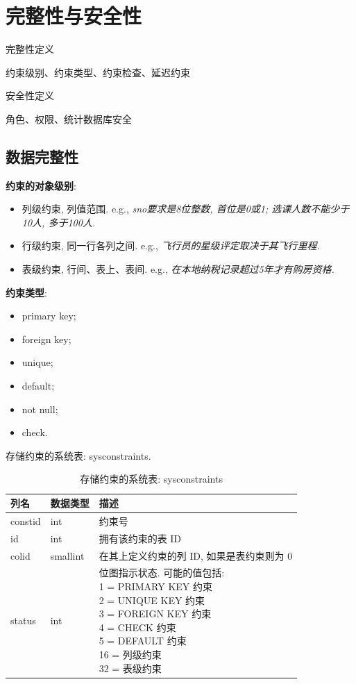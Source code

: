 \chapter{完整性与安全性}

\begin{introduction}[期末考试提纲]
    \item 完整性定义
    \item 约束级别、约束类型、约束检查、延迟约束
    \item 安全性定义
    \item 角色、权限、统计数据库安全
\end{introduction}

\section{数据完整性}

\textbf{约束的对象级别}:
\begin{itemize}
    \item 列级约束, 列值范围. e.g., \textit{sno要求是8位整数, 首位是0或1; 选课人数不能少于10人, 多于100人.}
    \item 行级约束, 同一行各列之间. e.g., \textit{飞行员的星级评定取决于其飞行里程.}
    \item 表级约束, 行间、表上、表间. e.g., \textit{在本地纳税记录超过5年才有购房资格.}
\end{itemize}

\textbf{约束类型}:
\begin{itemize}
    \item primary key;
    \item foreign key;
    \item unique;
    \item default;
    \item not null;
    \item check.
\end{itemize}

存储约束的系统表: sysconstraints.
\begin{table}[H]
    \centering
    \begin{tabular}{|l|l|l|}
        \hline
        \textbf{列名} & \textbf{数据类型} & \textbf{描述} \\ \hline
        constid & int & 约束号 \\ \hline
        id & int & 拥有该约束的表 ID \\ \hline
        colid & smallint & 在其上定义约束的列 ID, 如果是表约束则为 0 \\ \hline
        status & int & \makecell[l]{位图指示状态. 可能的值包括: \\ 1 = PRIMARY KEY 约束 \\
2 = UNIQUE KEY 约束 \\
3 = FOREIGN KEY 约束 \\
4 = CHECK 约束 \\
5 = DEFAULT 约束 \\
16 = 列级约束 \\
32 = 表级约束} \\ \hline
    \end{tabular}
    \caption{存储约束的系统表: sysconstraints}
\end{table}

